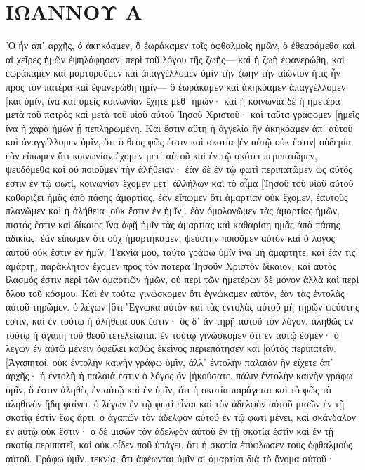 \section{ΙΩΑΝΝΟΥ Α}
Ὃ ἦν ἀπ᾽ ἀρχῆς, ὃ ἀκηκόαμεν, ὃ ἑωράκαμεν τοῖς ὀφθαλμοῖς ἡμῶν, ὃ ἐθεασάμεθα καὶ αἱ χεῖρες ἡμῶν ἐψηλάφησαν, περὶ τοῦ λόγου τῆς ζωῆς— 
καὶ ἡ ζωὴ ἐφανερώθη, καὶ ἑωράκαμεν καὶ μαρτυροῦμεν καὶ ἀπαγγέλλομεν ὑμῖν τὴν ζωὴν τὴν αἰώνιον ἥτις ἦν πρὸς τὸν πατέρα καὶ ἐφανερώθη ἡμῖν— 
ὃ ἑωράκαμεν καὶ ἀκηκόαμεν ἀπαγγέλλομεν [καὶ ὑμῖν, ἵνα καὶ ὑμεῖς κοινωνίαν ἔχητε μεθ᾽ ἡμῶν· καὶ ἡ κοινωνία δὲ ἡ ἡμετέρα μετὰ τοῦ πατρὸς καὶ μετὰ τοῦ υἱοῦ αὐτοῦ Ἰησοῦ Χριστοῦ· 
καὶ ταῦτα γράφομεν [ἡμεῖς ἵνα ἡ χαρὰ ἡμῶν ᾖ πεπληρωμένη. 
Καὶ ἔστιν αὕτη ἡ ἀγγελία ἣν ἀκηκόαμεν ἀπ᾽ αὐτοῦ καὶ ἀναγγέλλομεν ὑμῖν, ὅτι ὁ θεὸς φῶς ἐστιν καὶ σκοτία [ἐν αὐτῷ οὐκ ἔστιν] οὐδεμία. 
ἐὰν εἴπωμεν ὅτι κοινωνίαν ἔχομεν μετ᾽ αὐτοῦ καὶ ἐν τῷ σκότει περιπατῶμεν, ψευδόμεθα καὶ οὐ ποιοῦμεν τὴν ἀλήθειαν· 
ἐὰν δὲ ἐν τῷ φωτὶ περιπατῶμεν ὡς αὐτός ἐστιν ἐν τῷ φωτί, κοινωνίαν ἔχομεν μετ᾽ ἀλλήλων καὶ τὸ αἷμα [Ἰησοῦ τοῦ υἱοῦ αὐτοῦ καθαρίζει ἡμᾶς ἀπὸ πάσης ἁμαρτίας. 
ἐὰν εἴπωμεν ὅτι ἁμαρτίαν οὐκ ἔχομεν, ἑαυτοὺς πλανῶμεν καὶ ἡ ἀλήθεια [οὐκ ἔστιν ἐν ἡμῖν]. 
ἐὰν ὁμολογῶμεν τὰς ἁμαρτίας ἡμῶν, πιστός ἐστιν καὶ δίκαιος ἵνα ἀφῇ ἡμῖν τὰς ἁμαρτίας καὶ καθαρίσῃ ἡμᾶς ἀπὸ πάσης ἀδικίας. 
ἐὰν εἴπωμεν ὅτι οὐχ ἡμαρτήκαμεν, ψεύστην ποιοῦμεν αὐτὸν καὶ ὁ λόγος αὐτοῦ οὐκ ἔστιν ἐν ἡμῖν. 
Τεκνία μου, ταῦτα γράφω ὑμῖν ἵνα μὴ ἁμάρτητε. καὶ ἐάν τις ἁμάρτῃ, παράκλητον ἔχομεν πρὸς τὸν πατέρα Ἰησοῦν Χριστὸν δίκαιον, 
καὶ αὐτὸς ἱλασμός ἐστιν περὶ τῶν ἁμαρτιῶν ἡμῶν, οὐ περὶ τῶν ἡμετέρων δὲ μόνον ἀλλὰ καὶ περὶ ὅλου τοῦ κόσμου. 
Καὶ ἐν τούτῳ γινώσκομεν ὅτι ἐγνώκαμεν αὐτόν, ἐὰν τὰς ἐντολὰς αὐτοῦ τηρῶμεν. 
ὁ λέγων [ὅτι Ἔγνωκα αὐτὸν καὶ τὰς ἐντολὰς αὐτοῦ μὴ τηρῶν ψεύστης ἐστίν, καὶ ἐν τούτῳ ἡ ἀλήθεια οὐκ ἔστιν· 
ὃς δ᾽ ἂν τηρῇ αὐτοῦ τὸν λόγον, ἀληθῶς ἐν τούτῳ ἡ ἀγάπη τοῦ θεοῦ τετελείωται. ἐν τούτῳ γινώσκομεν ὅτι ἐν αὐτῷ ἐσμεν· 
ὁ λέγων ἐν αὐτῷ μένειν ὀφείλει καθὼς ἐκεῖνος περιεπάτησεν καὶ [αὐτὸς περιπατεῖν. 
[Ἀγαπητοί, οὐκ ἐντολὴν καινὴν γράφω ὑμῖν, ἀλλ᾽ ἐντολὴν παλαιὰν ἣν εἴχετε ἀπ᾽ ἀρχῆς· ἡ ἐντολὴ ἡ παλαιά ἐστιν ὁ λόγος ὃν [ἠκούσατε. 
πάλιν ἐντολὴν καινὴν γράφω ὑμῖν, ὅ ἐστιν ἀληθὲς ἐν αὐτῷ καὶ ἐν ὑμῖν, ὅτι ἡ σκοτία παράγεται καὶ τὸ φῶς τὸ ἀληθινὸν ἤδη φαίνει. 
ὁ λέγων ἐν τῷ φωτὶ εἶναι καὶ τὸν ἀδελφὸν αὐτοῦ μισῶν ἐν τῇ σκοτίᾳ ἐστὶν ἕως ἄρτι. 
ὁ ἀγαπῶν τὸν ἀδελφὸν αὐτοῦ ἐν τῷ φωτὶ μένει, καὶ σκάνδαλον ἐν αὐτῷ οὐκ ἔστιν· 
ὁ δὲ μισῶν τὸν ἀδελφὸν αὐτοῦ ἐν τῇ σκοτίᾳ ἐστὶν καὶ ἐν τῇ σκοτίᾳ περιπατεῖ, καὶ οὐκ οἶδεν ποῦ ὑπάγει, ὅτι ἡ σκοτία ἐτύφλωσεν τοὺς ὀφθαλμοὺς αὐτοῦ. 
Γράφω ὑμῖν, τεκνία, ὅτι ἀφέωνται ὑμῖν αἱ ἁμαρτίαι διὰ τὸ ὄνομα αὐτοῦ· 
